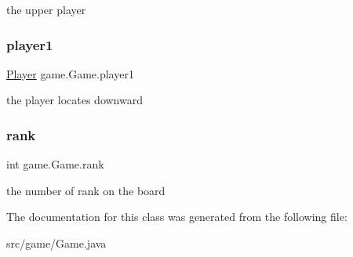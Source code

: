 the upper player \mbox{\label{classgame_1_1_game_ae4a1dc482dba322c7a5d3955efe01c81}} 
\subsubsection{\texorpdfstring{player1}{player1}}
{\footnotesize\ttfamily \mbox{\hyperlink{classgame_1_1_player}{Player}} game.\+Game.\+player1}

the player locates downward \mbox{\label{classgame_1_1_game_a7b89934f8f5f80ac47eb7b55f643d081}} 
\subsubsection{\texorpdfstring{rank}{rank}}
{\footnotesize\ttfamily int game.\+Game.\+rank}

the number of rank on the board 

The documentation for this class was generated from the following file\+:\begin{DoxyCompactItemize}
\item 
src/game/Game.\+java\end{DoxyCompactItemize}
